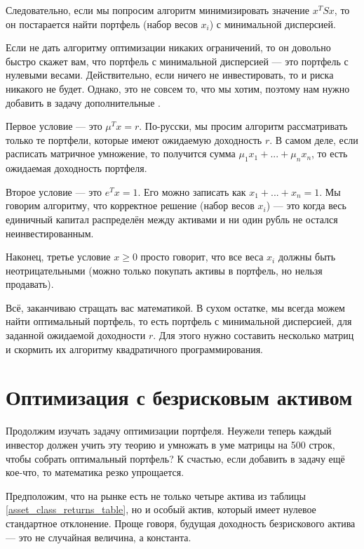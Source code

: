Следовательно, если мы попросим алгоритм минимизировать значение $x^TSx$, то он постарается найти портфель (набор весов $x_i$) с минимальной дисперсией.

Если не дать алгоритму оптимизации никаких ограничений, то он довольно быстро скажет вам, что портфель с минимальной дисперсией --- это портфель с нулевыми весами. Действительно, если ничего не инвестировать, то и риска никакого не будет. Однако, это не совсем то, что мы хотим, поэтому нам нужно добавить в задачу дополнительные .

Первое условие --- это $\mu^Tx = r$. По-русски, мы просим алгоритм рассматривать только те портфели, которые имеют ожидаемую доходность $r$. В самом деле, если расписать матричное умножение, то получится сумма $\mu_1x_1 + ... + \mu_nx_n$, то есть ожидаемая доходность портфеля.

Второе условие --- это $e^Tx = 1$. Его можно записать как $x_1 + ... + x_n = 1$. Мы говорим алгоритму, что корректное решение (набор весов $x_i$) --- это когда весь единичный капитал распределён между активами и ни один рубль не остался неинвестированным.

Наконец, третье условие $x \ge 0$ просто говорит, что все веса $x_i$ должны быть неотрицательными (можно только покупать активы в портфель, но нельзя продавать).

Всё, заканчиваю стращать вас математикой. В сухом остатке, мы всегда можем найти оптимальный портфель, то есть портфель с минимальной дисперсией, для заданной ожидаемой доходности $r$. Для этого нужно составить несколько матриц и скормить их алгоритму квадратичного программирования.

\section*{Оптимизация с безрисковым активом}

Продолжим изучать задачу оптимизации портфеля. Неужели теперь каждый инвестор должен учить эту теорию и умножать в уме матрицы на 500 строк, чтобы собрать оптимальный портфель? К счастью, если добавить в задачу ещё кое-что, то математика резко упрощается.

Предположим, что на рынке есть не только четыре актива из таблицы \ref{asset_class_returns_table}, но и особый  актив, который имеет нулевое стандартное отклонение. Проще говоря, будущая доходность безрискового актива --- это не случайная величина, а константа. 


